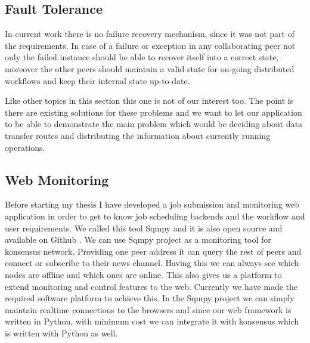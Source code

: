 \subsection{Fault Tolerance}
In current work there is no failure recovery mechanism, since it was not part of the requirements. In case of a failure or exception in any 
collaborating peer not only the failed instance should be able to recover itself into a correct state, moreover the other peers should maintain
a valid state for on-going distributed workflows and keep their internal state up-to-date.

Like other topics in this section this one is not of our interest too.
The point is there are existing solutions for these problems 
and we want to let our application to be able to demonstrate the main problem which would be 
deciding about data transfer routes and distributing the information about currently running operations.

\subsection{Web Monitoring}
Before starting my thesis I have developed a job submission and monitoring web application in order to get to know 
job scheduling backends and the workflow and user requirements. We called this tool Sqmpy and it is also open source and
available on Github \cite{sqmpy}. We can use Sqmpy project as a monitoring tool for konsensus network.
Providing one peer address it can query the rest of peers and connect or 
subscribe to their news channel. Having this we can always see which nodes are
offline and which ones are online. This also gives us a platform to extend
monitoring and control features to the web. Currently we have made the 
required software platform to achieve this. In the Sqmpy project we can simply maintain realtime connections to the browsers and since
our web framework is written in Python, with minimum cost we can integrate it with konsensus which is written with Python as well.